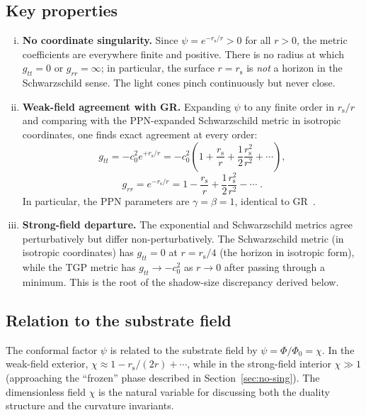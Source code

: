 \documentclass[11pt,a4paper]{article}
\theoremstyle{definition}
\theoremstyle{remark}
\newcommand{\PhiZero}{\varPhi_0}
\newcommand{\rs}{r_{\mathrm{s}}}
\renewcommand{\Phi}{\varPhi}
\begin{document}
\subsection{Key properties}

\begin{enumerate}[(i)]
\item \textbf{No coordinate singularity.}\quad
  Since $\psi = e^{-\rs/r} > 0$ for all $r > 0$, the metric
  coefficients are everywhere finite and positive.  There is no radius at
  which $g_{tt} = 0$ or $g_{rr} = \infty$; in particular, the surface
  $r = \rs$ is \emph{not} a horizon in the Schwarzschild sense.  The
  light cones pinch continuously but never close.

\item \textbf{Weak-field agreement with GR.}\quad
  Expanding $\psi$ to any finite order in $\rs/r$ and comparing with
  the PPN-expanded Schwarzschild metric in isotropic coordinates, one
  finds exact agreement at every order:
  \begin{equation}
    g_{tt} = -c_0^2 e^{+\rs/r}
    = -c_0^2\!\left(1 + \frac{\rs}{r} + \frac{1}{2}\frac{\rs^2}{r^2}
      + \cdots\right),
  \end{equation}
  \begin{equation}
    g_{rr} = e^{-\rs/r}
    = 1 - \frac{\rs}{r} + \frac{1}{2}\frac{\rs^2}{r^2} - \cdots\;.
  \end{equation}
  In particular, the PPN parameters are $\gamma = \beta = 1$, identical
  to GR~\cite{Will2014}.

\item \textbf{Strong-field departure.}\quad
  The exponential and Schwarzschild metrics agree perturbatively but
  differ non-perturbatively.  The Schwarzschild metric (in isotropic
  coordinates) has $g_{tt} = 0$ at $r = \rs/4$ (the horizon in isotropic
  form), while the TGP metric has $g_{tt} \to -c_0^2$ as $r \to 0$
  after passing through a minimum.  This is the root of the shadow-size
  discrepancy derived below.
\end{enumerate}

\subsection{Relation to the substrate field}

The conformal factor $\psi$ is related to the substrate field by
$\psi = \Phi/\PhiZero = \chi$.  In the weak-field exterior,
$\chi \approx 1 - \rs/(2r) + \cdots$, while in the strong-field
interior $\chi \gg 1$ (approaching the ``frozen'' phase described in
Section~\ref{sec:no-sing}).  The dimensionless field $\chi$ is the
natural variable for discussing both the duality structure and the
curvature invariants.
\end{document}
